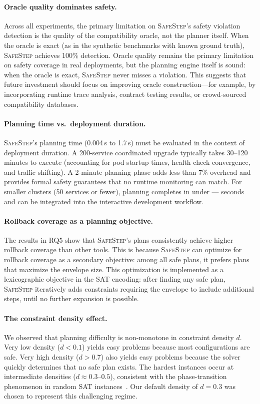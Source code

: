\documentclass[10pt,twocolumn]{article}
\newcommand{\safestep}{\textsc{SafeStep}}
\begin{document}
\paragraph{Oracle quality dominates safety.}
Across all experiments, the primary limitation on \safestep{}'s
safety violation detection is the quality of the compatibility
oracle, not the planner itself. When the oracle is exact
(as in the synthetic benchmarks with known ground truth),
\safestep{} achieves 100\% detection. Oracle quality remains the
primary limitation on safety coverage in real deployments, but the
planning engine itself is sound: when the oracle is exact,
\safestep{} never misses a violation.
This suggests
that future investment should focus on improving oracle
construction---for example, by incorporating runtime trace
analysis, contract testing results, or crowd-sourced
compatibility databases.

\paragraph{Planning time vs.\ deployment duration.}
\safestep{}'s planning time (0.004\,s to 1.7\,s) must be
evaluated in the context of deployment duration. A
200-service coordinated upgrade typically takes 30--120 minutes
to execute (accounting for pod startup times, health check
convergence, and traffic shifting). A 2-minute planning phase
adds less than 7\% overhead and provides formal safety
guarantees that no runtime monitoring can match. For smaller
clusters (50 services or fewer), planning completes in under
--- seconds and can be integrated into the interactive
development workflow.

\paragraph{Rollback coverage as a planning objective.}
The results in RQ5 show that \safestep{}'s plans consistently
achieve higher rollback coverage than other tools. This is
because \safestep{} can optimize for rollback coverage as a
secondary objective: among all safe plans, it prefers plans
that maximize the envelope size. This optimization is
implemented as a lexicographic objective in the SAT encoding:
after finding any safe plan, \safestep{} iteratively adds
constraints requiring the envelope to include additional steps,
until no further expansion is possible.

\paragraph{The constraint density effect.}
We observed that planning difficulty is non-monotone in
constraint density $d$. Very low density ($d < 0.1$) yields
easy problems because most configurations are safe. Very high
density ($d > 0.7$) also yields easy problems because the
solver quickly determines that no safe plan exists. The hardest
instances occur at intermediate densities ($d \approx 0.3$--$0.5$),
consistent with the phase-transition phenomenon in random SAT
instances~\cite{kautz-satplan-1992}. Our default density of
$d = 0.3$ was chosen to represent this challenging regime.
\end{document}
